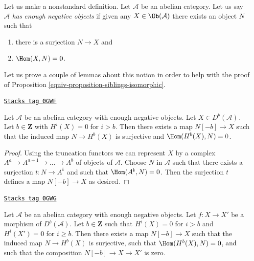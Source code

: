 Let us make a nonstandard definition. Let $\mathcal{A}$ be an abelian
category. Let us say $\mathcal{A}$ {\it has enough negative objects}
if given any $X \in \Ob(\mathcal{A})$ there exists an object $N$ such that
\begin{enumerate}
\item there is a surjection $N \to X$ and
\item $\Hom(X, N) = 0$.
\end{enumerate}
Let us prove a couple of lemmas about this notion in order to
help with the proof of Proposition \ref{equiv-proposition-siblings-isomorphic}.

\begin{lemma}
\label{equiv-lemma-good-map}
\href{https://stacks.math.columbia.edu/tag/0GWF}{\texttt{Stacks tag 0GWF}}

Let $\mathcal{A}$ be an abelian category with enough negative objects.
Let $X \in D^b(\mathcal{A})$. Let $b \in \mathbf{Z}$ with
$H^i(X) = 0$ for $i > b$. Then
there exists a map $N[-b] \to X$ such that the induced map
$N \to H^b(X)$ is surjective and $\Hom(H^b(X), N) = 0$.
\end{lemma}

\begin{proof}
Using the truncation functors we can represent $X$ by a complex
$A^a \to A^{a + 1} \to \ldots \to A^b$ of objects of $\mathcal{A}$.
Choose $N$ in $\mathcal{A}$ such that there exists a surjection
$t : N \to A^b$ and such that $\Hom(A^b, N) = 0$. Then the surjection $t$
defines a map $N[-b] \to X$ as desired.
\end{proof}

\begin{lemma}
\label{equiv-lemma-good-map-zero}
\href{https://stacks.math.columbia.edu/tag/0GWG}{\texttt{Stacks tag 0GWG}}

Let $\mathcal{A}$ be an abelian category with enough negative objects.
Let $f : X \to X'$ be a morphism of $D^b(\mathcal{A})$. Let $b \in \mathbf{Z}$
such that $H^i(X) = 0$ for $i > b$ and $H^i(X') = 0$ for $i \geq b$.
Then there exists a map $N[-b] \to X$ such that the induced map
$N \to H^b(X)$ is surjective, such that $\Hom(H^b(X), N) = 0$, and
such that the composition $N[-b] \to X \to X'$ is zero.
\end{lemma}

